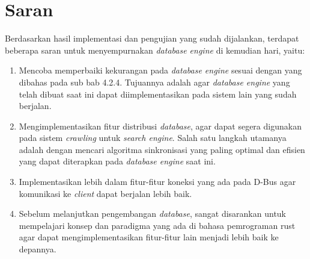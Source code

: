 \section{Saran}

Berdasarkan hasil implementasi dan pengujian yang sudah dijalankan, terdapat beberapa saran untuk menyempurnakan \emph{database engine} di kemudian hari, yaitu:

\begin{enumerate}
	\item Mencoba memperbaiki kekurangan pada \emph{database engine} sesuai dengan yang dibahas pada sub bab 4.2.4. Tujuannya adalah agar \emph{database engine} yang telah dibuat 
	saat ini dapat diimplementasikan pada sistem lain yang sudah berjalan.
	\item Mengimplementasikan fitur distribusi \emph{database}, agar dapat segera digunakan pada sistem \emph{crawling} untuk \emph{search engine}. Salah satu langkah utamanya
	adalah dengan mencari algoritma sinkronisasi yang paling optimal dan efisien yang dapat diterapkan pada \emph{database engine} saat ini.
	\item Implementasikan lebih dalam fitur-fitur koneksi yang ada pada D-Bus agar komunikasi ke \emph{client} dapat berjalan lebih baik.
	\item Sebelum melanjutkan pengembangan \emph{database}, sangat disarankan untuk mempelajari konsep dan paradigma yang ada di bahasa pemrograman rust agar dapat mengimplementasikan
	fitur-fitur lain menjadi lebih baik ke depannya.
\end{enumerate}


\begin{comment}

\end{comment}
